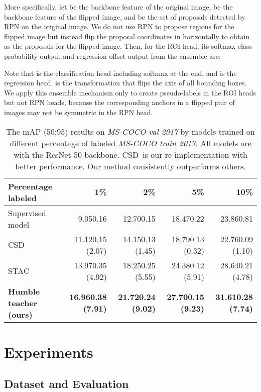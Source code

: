 \documentclass[final]{cvpr}
\begin{document}
More specifically, let  be the backbone feature of the original image,  be the backbone feature of the flipped image, and  be the set of proposals detected by RPN on the original image.
We do not use RPN to propose regions for the flipped image but instead flip the proposal coordinates in  horizontally to obtain  as the proposals for the flipped image. 
Then, for the ROI head, its softmax class probability output  and regression offset output  from the ensemble are:

Note that  is the classification head including softmax at the end, and  is the regression head.
 is the transformation that flips the  axis of all bounding boxes.
We apply this ensemble mechanism only to create pseudo-labels in the ROI heads but not RPN heads, because the corresponding anchors in a flipped pair of images may not be symmetric in the RPN head.

\begin{table*}\centering
  \begin{tabular}{lrrrr}
    \toprule
    Percentage labeled & 1\% & 2\% & 5\% & 10\% \\
    \midrule
    Supervised model & 9.050.16 & 12.700.15 & 18.470.22 & 23.860.81 \\
    CSD & 11.120.15 (2.07) & 14.150.13 (1.45) & 18.790.13 (0.32) & 22.760.09 (1.10)\\
    STAC~\cite{sohn2020simple} & 13.970.35 (4.92) & 18.250.25 (5.55) & 24.380.12 (5.91) & 28.640.21 (4.78)\\
    \textbf{Humble teacher (ours)} & \textbf{16.960.38 (7.91)} & \textbf{21.720.24 (9.02)} & \textbf{27.700.15 (9.23)} & \textbf{31.610.28 (7.74)}\\
    \bottomrule
  \end{tabular}
  \caption{The mAP (50:95) results on \textit{MS-COCO val 2017} by models trained on different percentage of labeled \textit{MS-COCO train 2017}. All models are with the ResNet-50 backbone. CSD~is our re-implementation with better performance. Our method consistently outperforms others.}
  \label{tab:MS-COCO_percentage}
\end{table*}


\section{Experiments}

\subsection{Dataset and Evaluation}
\label{sec:datasets}
\end{document}
